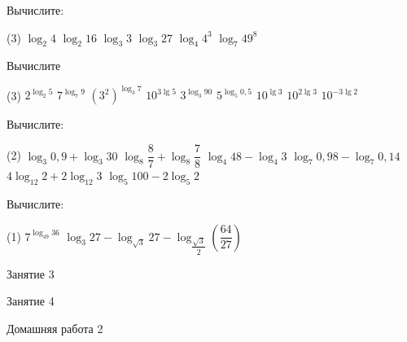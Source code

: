 \begin{homework}[number=1]
	\begin{listofex}
		\item Вычислите:
		\begin{tasks}(3)
			\task \( \log_2 4 \)
			\task \( \log_2 16 \)
			\task \( \log_3 3 \)
			\task \( \log_3 27 \)
			\task \( \log_4 4^3 \)
			\task \( \log_7 49^8 \)
		\end{tasks}
		\item Вычислите
		\begin{tasks}(3)
			\task \( 2^{\log_2 5} \)
			\task \( 7^{\log_7 9} \)
			\task \( (3^2)^{\log_3 7} \)
			\task \( 10^{3\lg 5} \)
			\task \( 3^{\log_3 90} \)
			\task \( 5^{\log_5 0,5} \)
			\task \( 10^{\lg 3} \)
			\task \( 10^{2\lg 3} \)
			\task \( 10^{-3\lg 2} \)
			\end{tasks}
		\item Вычислите:
		\begin{tasks}(2)
			\task \( \log_3 0,9 + \log_3 30 \)
			\task \( \log_8 \dfrac{8}{7} + \log_8 \dfrac{7}{8} \)
			\task \( \log_4 48 - \log_4 3 \)
			\task \( \log_7 0,98 - \log_7 0,14 \)
			\task \( 4\log_{12} 2 + 2\log_{12} 3 \)
			\task \( \log_5 100 - 2 \log_5 2 \)
		\end{tasks}
		\item Вычислите:
		\begin{tasks}(1)
			\task \( 7^{\log_{49} 36} \)
			\task \( \log_3 27 - \log_{\sqrt{3}} 27 - \log_{\dfrac{\sqrt{3}}{2}} \left( \dfrac{64}{27} \right)  \)
		\end{tasks}
	\end{listofex}
\end{homework}

\begin{class}[number=3]
	\begin{listofex}
		\item Занятие 3 
	\end{listofex}
\end{class}

\begin{class}[number=4]
	\begin{listofex}
		\item Занятие 4
	\end{listofex}
\end{class}

\begin{homework}[number=2]
	\begin{listofex}
		\item Домашняя работа 2
	\end{listofex}
\end{homework}

